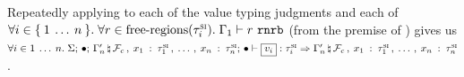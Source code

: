 \begin{preservation}
{    Repeatedly applying  to each of the
    value typing judgments and each of $\forall i \in \{ \:  1 \: \ldots \: n  \: \}. \;
    \forall r \in \textrm{free-regions}(\tau^\textsc{si}_i). \;
    \Gamma_1 \vdash r \ \mathtt{rnrb}$ (from the premise of
    ) gives us
    $\forall i \in 1 \oxdots n. \;
    \oxtypjudge{\oxglobalctx}{\oxemptyctx}{\oxemptyctx}{
      \oxnewframe{\oxvarctx_n^\prime}{
        \oxextendctx{\oxframe_c}{
          \oxvarctxentry{\oxid_1}{\oxsitype_1} \oxdotsc
          \oxvarctxentry{\oxid_n}{\oxsitype_n}
        }
      }
    }{
      \oxvalue_i
    }{\oxsitype_i}{
      \oxnewframe{\oxvarctx_n^\prime}{
        \oxextendctx{\oxframe_c}{
          \oxvarctxentry{\oxid_1}{\oxsitype_1} \oxdotsc
          \oxvarctxentry{\oxid_n}{\oxsitype_n}
        }
      }
    }$.
  }
\end{preservation} %

